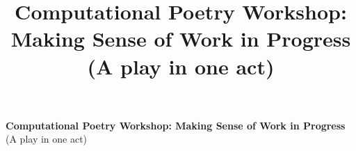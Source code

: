 \documentclass[letterpaper]{article}
\title{Computational Poetry Workshop: Making Sense of Work in Progress\\[.2cm](A play in one act)}
\begin{document}
 
\begin{center}
\textbf{Computational Poetry Workshop: Making Sense of Work in Progress}\\[.2cm](A play in one act)
\end{center}

\bigskip







\end{document}
